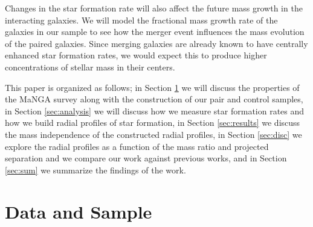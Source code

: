 \documentclass[iop,revtex4,twocolumn,apj,numberedappendix,appendixfloats]{emulateapj}
\begin{document}
Changes in the star formation rate will also affect the future mass growth in the interacting galaxies. We will model the fractional mass growth rate of the galaxies in our sample to see how the merger event influences the mass evolution of the paired galaxies. Since merging galaxies are already known to have centrally enhanced star formation rates, we would expect this to produce higher concentrations of stellar mass in their centers.

This paper is organized as follows; in Section \ref{sec:data} we will discuss the properties of the MaNGA survey along with the construction of our pair and control samples, in Section \ref{sec:analysis} we will discuss how we measure star formation rates and how we build radial profiles of star formation, in Section \ref{sec:results} we discuss the mass independence of the constructed radial profiles, in Section \ref{sec:disc} we explore the radial profiles as a function of the mass ratio and projected separation and we compare our work against previous works, and in Section \ref{sec:sum} we summarize the findings of the work. 

\section{Data and Sample}\label{sec:data}
\end{document}
